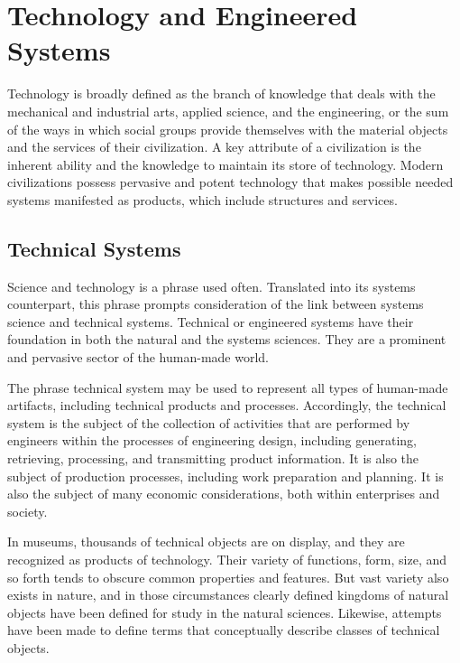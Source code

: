 \section{Technology and Engineered Systems}

Technology is broadly defined as the branch of knowledge that deals with the mechanical and industrial arts, applied science, and the engineering, or the sum of the ways in which social groups provide themselves with the material objects and the services of their civilization. A key attribute of a civilization is the inherent ability and the knowledge to maintain its store of technology. Modern civilizations possess pervasive and potent technology that makes possible needed systems manifested as products, which include structures and services.

\subsection{Technical Systems}

Science and technology is a phrase used often. Translated into its systems counterpart, this phrase prompts consideration of the link between systems science and technical systems. Technical or engineered systems have their foundation in both the natural and the systems sciences. They are a prominent and pervasive sector of the human-made world.

The phrase technical system may be used to represent all types of human-made artifacts, including technical products and processes. Accordingly, the technical system is the subject of the collection of activities that are performed by engineers within the processes of engineering design, including generating, retrieving, processing, and transmitting product information. It is also the subject of production processes, including work preparation and planning. It is also the subject of many economic considerations, both within enterprises and society.

In museums, thousands of technical objects are on display, and they are recognized as products of technology. Their variety of functions, form, size, and so forth tends to obscure common properties and features. But vast variety also exists in nature, and in those circumstances clearly defined kingdoms of natural objects have been defined for study in the natural sciences. Likewise, attempts have been made to define terms that conceptually describe classes of technical objects.

